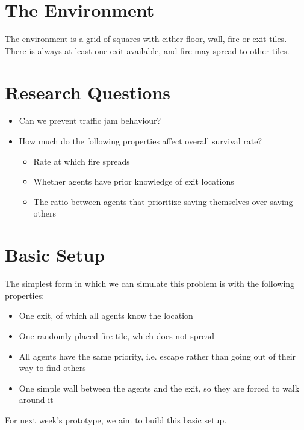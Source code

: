 \documentclass[a4paper]{article}
\begin{document}
\section{The Environment}
The environment is a grid of squares with either floor, wall, fire or exit tiles. There is always at least one exit available, and fire may spread to other tiles.

\section{Research Questions}
\begin{itemize}
\item Can we prevent traffic jam behaviour?
\item How much do the following properties affect overall survival rate?
\begin{itemize}
\item Rate at which fire spreads
\item Whether agents have prior knowledge of exit locations
\item The ratio between agents that prioritize saving themselves over saving others
\end{itemize}
\end{itemize}

\section{Basic Setup}
The simplest form in which we can simulate this problem is with the following properties:
\begin{itemize}
\item One exit, of which all agents know the location
\item One randomly placed fire tile, which does not spread
\item All agents have the same priority, i.e. escape rather than going out of their way to find others
\item One simple wall between the agents and the exit, so they are forced to walk around it
\end{itemize}
For next week's prototype, we aim to build this basic setup.
\end{document}
